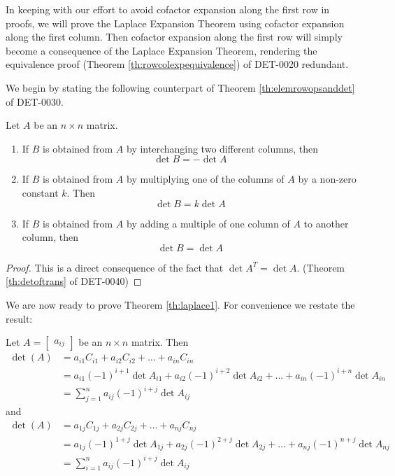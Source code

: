 \documentclass{ximera}
\begin{document}
In keeping with our effort to avoid cofactor expansion along the first row in proofs, we will prove the  Laplace Expansion Theorem using cofactor expansion along the first column.  Then cofactor expansion along the first row will simply become a consequence of the Laplace Expansion Theorem, rendering the equivalence proof (Theorem \ref{th:rowcolexpequivalence}) of DET-0020 redundant.

We begin by stating the following counterpart of Theorem \ref{th:elemrowopsanddet} of DET-0030.
\begin{theorem}\label{th:elemcolopsanddet}
Let $A$ be an $n\times n$ matrix.  
\begin{enumerate}
\item\label{item:colswapanddet}
If $B$ is obtained from $A$ by interchanging two different columns, then $$\det{B}=-\det{A}$$
\item \label{item:colconstantmultanddet}
If $B$ is obtained from $A$ by multiplying one of the columns of $A$ by a non-zero constant $k$.  Then $$\det{B}=k\det{A}$$
\item \label{item:addmultothercoldet}
If $B$ is obtained from $A$ by adding a multiple of one column of $A$ to another column, then
$$\det{B}=\det{A}$$
\end{enumerate}
\end{theorem}
\begin{proof}
This is a direct consequence of the fact that $\det{A^T}=\det{A}$. (Theorem \ref{th:detoftrans} of DET-0040)
\end{proof}

We are now ready to prove Theorem \ref{th:laplace1}.  For convenience we restate the result:


Let $A=\begin{bmatrix}a_{ij}\end{bmatrix}$ be an $n\times n$ matrix.  Then
\begin{align*}
\det(A)&=a_{i1}C_{i1}+a_{i2}C_{i2}+\ldots +a_{in}C_{in}\\
&=a_{i1}(-1)^{i+1}\det{A_{i1}}+a_{i2}(-1)^{i+2}\det{A_{i2}}+\ldots +a_{in}(-1)^{i+n}\det{A_{in}}\\
&=\sum_{j=1}^na_{ij}(-1)^{i+j}\det{A_{ij}}
\end{align*}
and
\begin{align*}
\det(A)&=a_{1j}C_{1j}+a_{2j}C_{2j}+\ldots +a_{nj}C_{nj}\\
&=a_{1j}(-1)^{1+j}\det{A_{1j}}+a_{2j}(-1)^{2+j}\det{A_{2j}}+\ldots +a_{nj}(-1)^{n+j}\det{A_{nj}}\\
&=\sum_{i=1}^na_{ij}(-1)^{i+j}\det{A_{ij}}
\end{align*}
\end{document}
